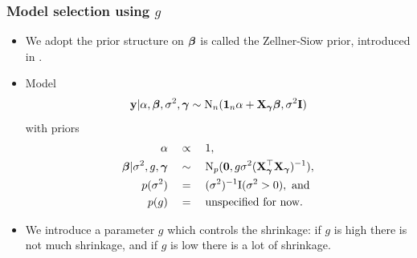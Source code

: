 \documentclass{beamer}
\begin{document}
\begin{frame}
	\frametitle{Model selection using $g$}
	\begin{itemize}
		\item We adopt the prior structure on ${\boldsymbol \beta}$ is called the Zellner-Siow prior, introduced in \cite{Zellner1980}.
		\item Model
		\begin{align*}
			{\bf y} | \alpha, {\boldsymbol \beta}, \sigma^2, {\boldsymbol \gamma} \sim \text{N}_n({\bf 1}_n \alpha + {\bf X}_{\boldsymbol \gamma} {\boldsymbol \beta}, \sigma^2 {\bf I}) 
		\end{align*}
		with priors
		\begin{align*}
			\alpha \quad & \propto \quad 1, \\
			{\boldsymbol \beta} | \sigma^2, g, {\boldsymbol \gamma} \quad & \sim \quad \text{N}_p({\bf 0}, g \sigma^2 ({\bf X}_{\boldsymbol \gamma}^\top {\bf X}_{\boldsymbol \gamma})^{-1}),                     \\
			p(\sigma^2)          \quad & = \quad (\sigma^2)^{-1} \text{I}(\sigma^2 > 0), \text{ and }                    \\
			p(g)                 \quad & = \quad \text{unspecified for now}.
		\end{align*}
		\item We introduce a parameter $g$ which controls the shrinkage: if $g$ is high there is not much shrinkage,
					and if $g$ is low there is a lot of shrinkage.
	\end{itemize}
\end{frame}

\end{document}
